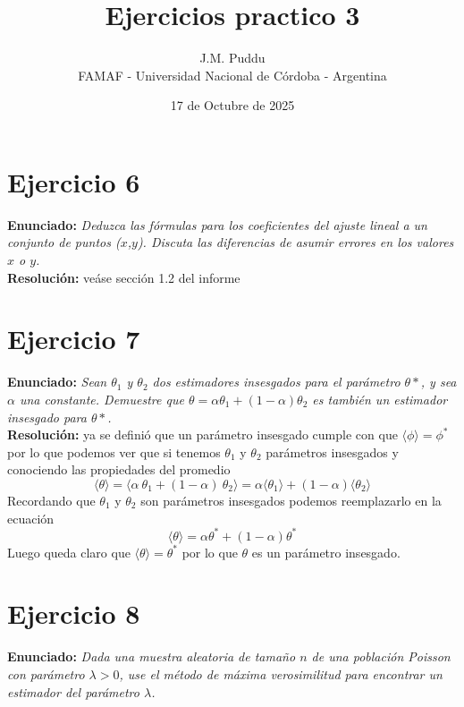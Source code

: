 \documentclass[twocolumn]{article}
\title{Ejercicios practico 3}
\author{J.M. Puddu \\ FAMAF - Universidad Nacional de Córdoba - Argentina}
\date{17 de Octubre de 2025}
\begin{document}
\twocolumn[
\begin{@twocolumnfalse}
    \maketitle
    \vspace{2em} %
\end{@twocolumnfalse}
]

\section{Ejercicio 6}
\textbf{Enunciado:}
\textit{Deduzca las fórmulas para los coeficientes del ajuste lineal a un conjunto de puntos ($x$,$y$). Discuta las diferencias de asumir errores en los valores $x$ o $y$. }\\

\textbf{Resolución:} veáse sección 1.2 del informe  

\section{Ejercicio 7}
\textbf{Enunciado:}
\textit{Sean $\theta_1$ y $\theta_2$ dos estimadores insesgados para el parámetro $\theta*$, y sea $\alpha$ una constante. Demuestre que
$\theta=\alpha\theta_1+(1-\alpha)\theta_2$ es también un estimador insesgado para $\theta*$.}\\

\textbf{Resolución:} ya se definió que un parámetro insesgado cumple con que $\langle\phi\rangle= \phi^*$ por lo que podemos ver que si tenemos $\theta_1$ y $\theta_2$ parámetros insesgados y conociendo las propiedades del promedio
\[
\langle\theta\rangle= \langle\alpha\: \theta_1 + (1-\alpha)\: \theta_2\rangle = \alpha \langle\theta_1\rangle + (1-\alpha)\langle\theta_2\rangle
\]
Recordando que $\theta_1$ y $  \theta_2$ son parámetros insesgados podemos reemplazarlo en la ecuación 
\[
\langle\theta\rangle= \alpha  \theta^* +(1-\alpha)\theta^*
\]
Luego queda claro que $\langle\theta\rangle=\theta^*$ por lo que $\theta$ es un parámetro insesgado.

\section{Ejercicio 8}
\textbf{Enunciado:}
\textit{Dada una muestra aleatoria de tamaño $n$ de una población Poisson con parámetro $\lambda>0$, use el método de máxima verosimilitud para encontrar un estimador del parámetro $\lambda$.}\\
\end{document}
